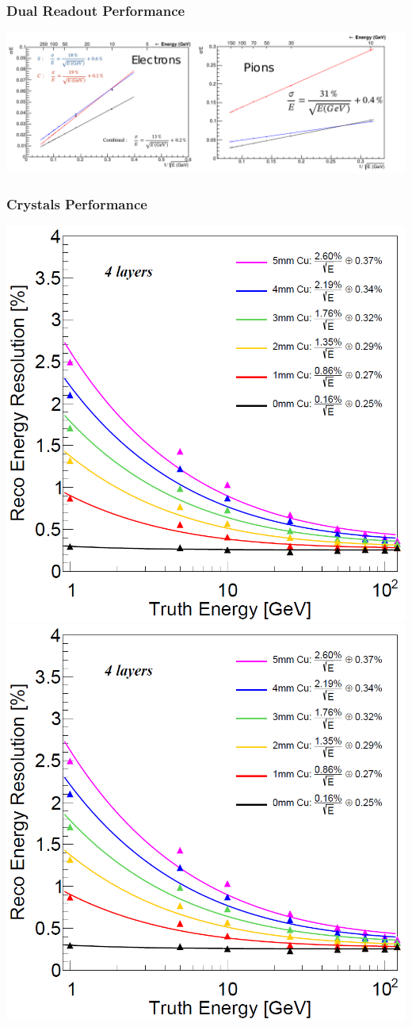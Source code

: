 \documentclass[aspectratio=169]{beamer}
\begin{document}
\begin{frame}
  \frametitle{Dual Readout Performance}

  \includegraphics[width=\linewidth]{figures/dual_readout_performance.pdf}
\end{frame}

\begin{frame}
  \frametitle{Crystals Performance}

  \includegraphics[width=.49\linewidth]{figures/CEPC_crystal_calo_perf_4layers.png}
  \includegraphics[width=.49\linewidth]{figures/CEPC_crystal_calo_perf_4layers.png}
\end{frame}
\end{document}
